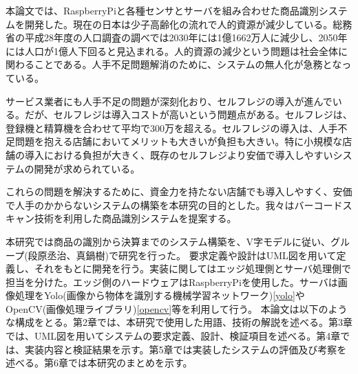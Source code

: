 本論文では、RaspberryPiと各種センサとサーバを組み合わせた商品識別システムを開発した。現在の日本は少子高齢化の流れで人的資源が減少している。総務省の平成28年度の人口調査の調べでは2030年には1億1662万人に減少し、2050年には人口が1億人下回ると見込まれる\cite{population}。人的資源の減少という問題は社会全体に関わることである。人手不足問題解消のために、システムの無人化が急務となっている。

サービス業者にも人手不足の問題が深刻化おり、セルフレジの導入が進んでいる。だが、セルフレジは導入コストが高いという問題点がある。セルフレジは、登録機と精算機を合わせて平均で300万を超える\cite{self_register}。セルフレジの導入は、人手不足問題を抱える店舗においてメリットも大きいが負担も大きい。特に小規模な店舗の導入における負担が大きく、既存のセルフレジより安価で導入しやすいシステムの開発が求められている。

これらの問題を解決するために、資金力を持たない店舗でも導入しやすく、安価で人手のかからないシステムの構築を本研究の目的とした。我々はバーコードスキャン技術を利用した商品識別システムを提案する。

本研究では商品の識別から決算までのシステム構築を、V字モデルに従い、グループ(段原丞治、真鍋樹)で研究を行った。
要求定義や設計はUML図を用いて定義し、それをもとに開発を行う。実装に関してはエッジ処理側とサーバ処理側で担当を分けた。エッジ側のハードウェアはRaspberryPiを使用した。サーバは画像処理をYolo(画像から物体を識別する機械学習ネットワーク)\ref{yolo}やOpenCV(画像処理ライブラリ)\ref{opencv}等を利用して行う。
本論文は以下のような構成をとる。第2章では、本研究で使用した用語、技術の解説を述べる。第3章では、UML図を用いてシステムの要求定義、設計、検証項目を述べる。第4章では、実装内容と検証結果を示す。第5章では実装したシステムの評価及び考察を述べる。第6章では本研究のまとめを示す。